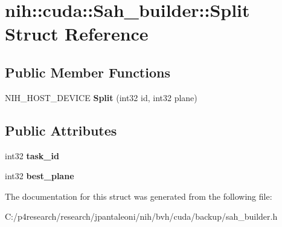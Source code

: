 \hypertarget{structnih_1_1cuda_1_1_sah__builder_1_1_split}{
\section{nih\-:\-:cuda\-:\-:\-Sah\-\_\-builder\-:\-:\-Split \-Struct \-Reference}
\label{structnih_1_1cuda_1_1_sah__builder_1_1_split}
}
\subsection*{\-Public \-Member \-Functions}
\begin{DoxyCompactItemize}
\item 
\hypertarget{structnih_1_1cuda_1_1_sah__builder_1_1_split_acd5358f19500d3b3a424bf51e898d416}{
\-N\-I\-H\-\_\-\-H\-O\-S\-T\-\_\-\-D\-E\-V\-I\-C\-E {\bfseries \-Split} (int32 id, int32 plane)}
\label{structnih_1_1cuda_1_1_sah__builder_1_1_split_acd5358f19500d3b3a424bf51e898d416}

\end{DoxyCompactItemize}
\subsection*{\-Public \-Attributes}
\begin{DoxyCompactItemize}
\item 
\hypertarget{structnih_1_1cuda_1_1_sah__builder_1_1_split_aba7f0b702f61ee28d55501ec45191f0f}{
int32 {\bfseries task\-\_\-id}}
\label{structnih_1_1cuda_1_1_sah__builder_1_1_split_aba7f0b702f61ee28d55501ec45191f0f}

\item 
\hypertarget{structnih_1_1cuda_1_1_sah__builder_1_1_split_a1223d0b86ef5128db5f026cacb92ed89}{
int32 {\bfseries best\-\_\-plane}}
\label{structnih_1_1cuda_1_1_sah__builder_1_1_split_a1223d0b86ef5128db5f026cacb92ed89}

\end{DoxyCompactItemize}


\-The documentation for this struct was generated from the following file\-:\begin{DoxyCompactItemize}
\item 
\-C\-:/p4research/research/jpantaleoni/nih/bvh/cuda/backup/sah\-\_\-builder.\-h\end{DoxyCompactItemize}
